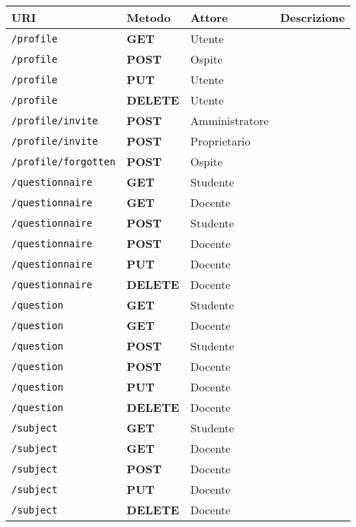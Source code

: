 \documentclass[12pt,a4paper]{article}
\begin{document}
\begin{center}
	\begin{longtable}[H]{p{} p{} p{} p{}}
		\toprule
		\textbf{URI} & \textbf{Metodo} & \textbf{Attore} & \textbf{Descrizione}\\*
		\midrule
		\texttt{/profile} & \textbf{GET} & Utente &  \\*
		\midrule
		\texttt{/profile} & \textbf{POST} & Ospite &  \\*
		\midrule
		\texttt{/profile} & \textbf{PUT} & Utente &  \\*
		\midrule
		\texttt{/profile} & \textbf{DELETE} & Utente &  \\*
		\midrule
		\texttt{/profile/invite} & \textbf{POST} & Amministratore &  \\*
		\midrule
		\texttt{/profile/invite} & \textbf{POST} & Proprietario &  \\*
		\midrule
		\texttt{/profile/forgotten} & \textbf{POST} & Ospite &  \\*
		
		\midrule
		\midrule
		\texttt{/questionnaire} & \textbf{GET} & Studente &  \\*
		\midrule
		\texttt{/questionnaire} & \textbf{GET} & Docente &  \\*
		\midrule
		\texttt{/questionnaire} & \textbf{POST} & Studente &  \\*
		\midrule
		\texttt{/questionnaire} & \textbf{POST} & Docente &  \\*
		\midrule
		\texttt{/questionnaire} & \textbf{PUT} & Docente &  \\*
		\midrule
		\texttt{/questionnaire} & \textbf{DELETE} & Docente &  \\*
		
		\midrule
		\midrule
		\texttt{/question} & \textbf{GET} & Studente &  \\*
		\midrule
		\texttt{/question} & \textbf{GET} & Docente &  \\*
		\midrule
		\texttt{/question} & \textbf{POST} & Studente &  \\*
		\midrule
		\texttt{/question} & \textbf{POST} & Docente &  \\*
		\midrule
		\texttt{/question} & \textbf{PUT} & Docente &  \\*
		\midrule
		\texttt{/question} & \textbf{DELETE} & Docente &  \\*
		
		\midrule
		\midrule
		\texttt{/subject} & \textbf{GET} & Studente &  \\*
		\midrule
		\texttt{/subject} & \textbf{GET} & Docente &  \\*
		\midrule
		\texttt{/subject} & \textbf{POST} & Docente &  \\*
		\midrule
		\texttt{/subject} & \textbf{PUT} & Docente &  \\*
		\midrule
		\texttt{/subject} & \textbf{DELETE} & Docente &  \\*
		

\end{longtable}
\end{center}
\end{document}
